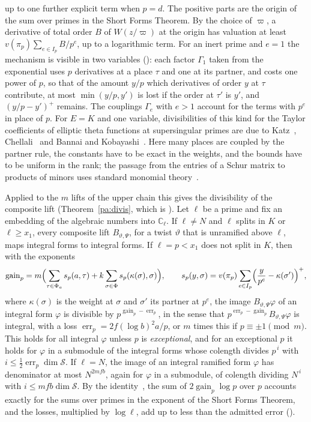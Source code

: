 \documentclass[10pt]{amsart}
\theoremstyle{definition}
\theoremstyle{remark}
\newcommand{\C}{\mathbb C}
\providecommand{\auPa}{\Phi_a}
\providecommand{\auPl}{\Phi}
\providecommand{\auS}{\mathcal S}
\providecommand{\auerr}{\operatorname{err}}
\providecommand{\augain}{\operatorname{gain}}
\begin{document}
up to one further explicit term when $p=d$. The positive parts are the origin of the sum over
primes in the Short Forms Theorem. By the choice of $\varpi$, a derivative of total order $B$ of
$W(z/\varpi)$ at the origin has valuation at least $v(\pi_p)\sum_{e\in I_p}B/p^e$, up to a
logarithmic term. For an inert prime and $e=1$ the mechanism is visible in two variables
({\cite[Proposition~14.11]{P46}}): each factor $\Gamma_1$ taken from the exponential uses $p$
derivatives at a place $\tau$ and one at its partner, and costs one power of $p$, so that of the
amount $y/p$ which derivatives of order $y$ at $\tau$ contribute, at most $\min(y/p,y')$ is lost
if the order at $\tau'$ is $y'$, and $(y/p-y')^+$ remains. The couplings $\Gamma_e$ with $e>1$
account for the terms with $p^e$ in place of $p$. For $E=K$ and one
variable, divisibilities of this kind for the Taylor coefficients of elliptic theta functions at
supersingular primes are due to Katz~\cite{KatzDivisibilities}, Chellali~\cite{Chellali} and
Bannai and Kobayashi~\cite{BannaiKobayashi}. Here many places are coupled by the partner rule,
the constants have to be exact in the weights, and the bounds have to be uniform in the rank; the
passage from the entries of a Schur matrix to products of minors uses standard monomial
theory~\cite{DEP}.

Applied to the $m$ lifts of the upper chain this gives the divisibility of the composite lift
(Theorem~\ref{pa:divis}, which is {\cite[Proposition~14.20]{P46}}). Let $\ell$ be a prime and fix an
embedding of the algebraic numbers into $\C_\ell$. If $\ell\ne N$ and $\ell$ splits in $K$ or
$\ell\ge x_1$, every composite lift $B_{\vartheta,\Psi}$, for a twist $\vartheta$ that is
unramified above $\ell$, maps integral forms to integral forms. If $\ell=p<x_1$ does not split in $K$, then
with the exponents
\[
\augain_p=m\Bigl(\sum_{\tau\in\auPa}s_p(a,\tau)+k\sum_{\sigma\in\auPl}s_p(\kappa(\sigma),\sigma)
\Bigr),\qquad s_p(y,\sigma)=v(\pi_p)\sum_{e\in I_p}\Bigl(\frac y{p^e}-\kappa(\sigma')\Bigr)^+,
\]
where $\kappa(\sigma)$ is the weight at $\sigma$ and $\sigma'$ its partner at $p^e$, the image
$B_{\vartheta,\Psi}\varphi$ of an integral form $\varphi$ is divisible by $p^{\augain_p-\auerr_p}$,
in the sense that $p^{\auerr_p-\augain_p}B_{\vartheta,\Psi}\varphi$ is integral, with a loss
$\auerr_p=2f(\log b)^2a/p$, or $m$ times this if $p\equiv\pm1\pmod m$. This holds for all integral
$\varphi$ unless $p$ is \emph{exceptional}, and for an exceptional $p$ it holds for $\varphi$ in a
submodule of the integral forms whose colength divides $p^{\,i}$ with $i\le\tfrac12\auerr_p\dim
\auS$. If $\ell=N$, the image of an integral ramified form $\varphi$ has denominator at most
$N^{2mfb}$, again for $\varphi$ in a submodule, of colength dividing $N^{\,i}$ with $i\le mfb\dim
\auS$. By the identity~{\cite[(42)]{P46}}, the sum of $2\augain_p\log p$ over $p$ accounts
exactly for the sums over primes in the exponent of the Short Forms Theorem, and the losses,
multiplied by $\log\ell$, add up to less than the admitted error ({\cite[Lemma~14.18]{P46}}).
\end{document}
